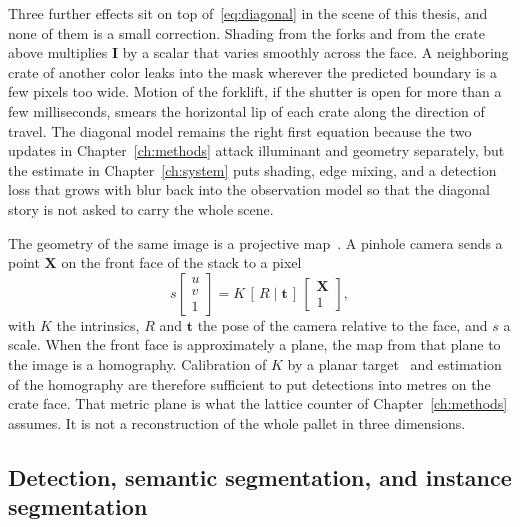 Three further effects sit on top of~\eqref{eq:diagonal} in the scene of this thesis, and none of them is a small correction. Shading from the forks and from the crate above multiplies $\mathbf{I}$ by a scalar that varies smoothly across the face. A neighboring crate of another color leaks into the mask wherever the predicted boundary is a few pixels too wide. Motion of the forklift, if the shutter is open for more than a few milliseconds, smears the horizontal lip of each crate along the direction of travel. The diagonal model remains the right first equation because the two updates in Chapter~\ref{ch:methods} attack illuminant and geometry separately, but the estimate in Chapter~\ref{ch:system} puts shading, edge mixing, and a detection loss that grows with blur back into the observation model so that the diagonal story is not asked to carry the whole scene.

The geometry of the same image is a projective map~\cite{hartley2004mvg}. A pinhole camera sends a point $\mathbf{X}$ on the front face of the stack to a pixel
\begin{equation}
s \begin{bmatrix} u \\ v \\ 1 \end{bmatrix}
= K \,[\,R \mid \mathbf{t}\,]\,
\begin{bmatrix} \mathbf{X} \\ 1 \end{bmatrix},
\label{eq:pinhole}
\end{equation}
with $K$ the intrinsics, $R$ and $\mathbf{t}$ the pose of the camera relative to the face, and $s$ a scale. When the front face is approximately a plane, the map from that plane to the image is a homography. Calibration of $K$ by a planar target~\cite{zhang2000calibration} and estimation of the homography are therefore sufficient to put detections into metres on the crate face. That metric plane is what the lattice counter of Chapter~\ref{ch:methods} assumes. It is not a reconstruction of the whole pallet in three dimensions.

\subsection{Detection, semantic segmentation, and instance segmentation}
\label{sec:tasks}

